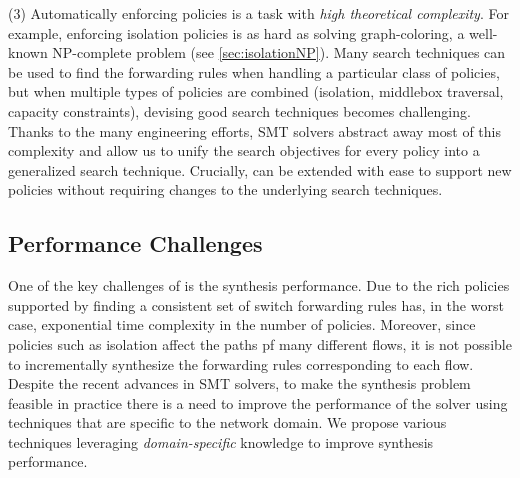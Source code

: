 (3) Automatically enforcing policies is a task with
\emph{high theoretical complexity}. 
For example, enforcing isolation policies
is as hard as solving
graph-coloring, a well-known
NP-complete problem (see \cref{sec:isolationNP}).
Many search techniques can be used to find the forwarding rules when
handling a particular class of policies, but when multiple types of
policies are combined (isolation, middlebox traversal, capacity
constraints), devising good search techniques becomes challenging.
Thanks to the many engineering efforts, SMT solvers abstract away most
of this complexity and allow us to unify the search objectives for
every policy into a generalized search technique.
Crucially, \Name can be extended with ease to
support new policies without requiring changes to the underlying search
techniques.

\subsection{Performance Challenges} \label{sec:performance}

One of the key challenges of \Name is the synthesis
performance. 
Due to the rich  policies supported by \Name
finding a consistent set of switch forwarding rules 
has, in the worst case, exponential time complexity in
the number of policies.
Moreover, since policies such as isolation affect
the paths pf many different flows, it is not possible to incrementally synthesize
the forwarding rules corresponding to each flow. 
Despite the recent advances in SMT solvers, to make
the synthesis problem feasible in practice
there is a need to improve the performance of the solver
using techniques that are specific to the network domain.
We propose various techniques leveraging
\emph{domain-specific} knowledge to improve synthesis performance. 

